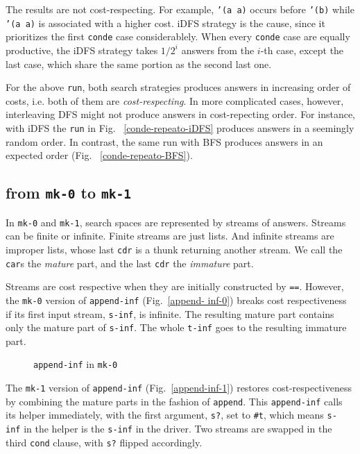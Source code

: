 \documentclass[format=acmlarge, review=true, authordraft=true]{acmart}
\begin{document}
The results are not cost-respecting. For example, \texttt{'(a a)} occurs before
\texttt{'(b)} while \texttt{'(a a)} is associated with a higher cost. 
iDFS strategy is the cause, since it prioritizes the first \texttt{conde} case
considerablely. When every \texttt{conde} case are equally productive, the iDFS
strategy takes $1/2^{i}$ answers from the $i$-th case, except the last case,
which share the same portion as the second last one.


For the above \texttt{run}, both search strategies produces answers in 
increasing order of costs, i.e. both of them are \emph{cost-respecting}. In 
more complicated cases, however, interleaving DFS might not produce answers in 
cost-repecting order. For instance, with iDFS the \texttt{run} in Fig.~
\ref{conde-repeato-iDFS} produces answers in a seemingly random order. In 
contrast, the same run with BFS produces answers in an expected order (Fig.~
\ref{conde-repeato-BFS}).



\subsection{from \texttt{mk-0} to \texttt{mk-1}}

In \texttt{mk-0} and \texttt{mk-1}, search spaces are represented by streams of 
answers. Streams can be finite or infinite. Finite streams are just lists. And 
infinite streams are improper lists, whose last \texttt{cdr} is a thunk 
returning another stream. We call the \texttt{car}s the \emph{mature} part, and 
the last \texttt{cdr} the \emph{immature} part. 

Streams are cost respective when they are initially constructed by \texttt{==}. 
However, the \texttt{mk-0} version of \texttt{append-inf} (Fig.~\ref{append-
inf-0}) breaks cost respectiveness if its first input stream, \texttt{s-inf}, 
is infinite. The resulting mature part contains only the mature part of 
\texttt{s-inf}. The whole \texttt{t-inf} goes to the resulting immature part.

\begin{figure}
	 	
	 \caption{\texttt{append-inf} in \texttt{mk-0}}
	 \label{append-inf-0}
\end{figure}

The \texttt{mk-1} version of \texttt{append-inf} (Fig.~\ref{append-inf-1}) 
restores cost-respectiveness by combining the mature parts in the fashion of 
\texttt{append}. This \texttt{append-inf} calls its helper immediately, with 
the first argument, \texttt{s?}, set to \texttt{\#{}t}, which means \texttt{s-
inf} in the helper is the \texttt{s-inf} in the driver. Two streams are swapped 
in the third \texttt{cond} clause, with \texttt{s?} flipped accordingly.
\end{document}
